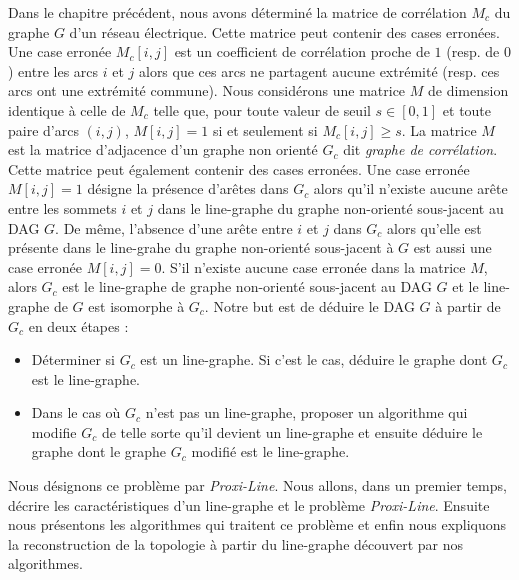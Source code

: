 Dans le chapitre pr\'ec\'edent, nous avons d\'etermin\'e la matrice de corr\'elation $M_c$ du graphe $G$ d'un r\'eseau \'electrique. Cette matrice peut contenir des cases erron\'ees. Une case erron\'ee  $M_c[i,j]$ est un coefficient de corr\'elation proche de $1$ (resp. de $0$) entre les arcs $i$ et $j$ alors que ces arcs ne partagent aucune extr\'emit\'e (resp. ces arcs ont une extr\'emit\'e commune).
\newline
Nous consid\'erons une matrice $M$ de dimension identique \`a celle de $M_c$ telle que, pour toute valeur de seuil $s \in [0,1]$ et toute paire d'arcs $(i,j)$, $M[i,j] = 1$ si et seulement si $M_c[i,j] \ge s$. La matrice $M$ est la matrice d'adjacence d'un graphe non orient\'e $G_c$ dit {\em graphe de corr\'elation}. Cette matrice peut \'egalement contenir des cases erron\'ees.  
Une case erron\'ee $M[i,j] = 1$ d\'esigne la pr\'esence d'ar\^etes dans $G_c$ alors qu'il n'existe aucune ar\^ete entre les sommets $i$ et $j$ dans le line-graphe du graphe non-orient\'e sous-jacent au DAG $G$. 
De m\^eme, l'absence d'une ar\^ete entre $i$ et $j$ dans $G_c$ alors qu'elle est pr\'esente dans le line-grahe du graphe non-orient\'e sous-jacent \`a $G$ est aussi une case erron\'ee  $M[i,j] = 0$.
\newline 
S'il n'existe aucune case erron\'ee dans la matrice $M$, alors $G_c$ est le line-graphe de graphe non-orient\'e sous-jacent au DAG $G$ et le line-graphe de $G$ est isomorphe \`a $G_c$.
Notre but est de d\'eduire le DAG $G$ \`a partir de $G_c$ en deux \'etapes :
\begin{itemize}
	\item D\'eterminer si $G_c$ est un line-graphe. Si c'est  le cas, d\'eduire le graphe dont $G_c$ est le line-graphe.
	\item Dans le cas o\`u $G_c$ n'est pas un line-graphe, proposer un algorithme qui modifie $G_c$ de telle sorte qu'il devient un line-graphe et ensuite d\'eduire le graphe dont le graphe $G_c$ modifi\'e est le line-graphe.
\end{itemize}
 Nous d\'esignons ce probl\`eme par {\em Proxi-Line}.
\newline
Nous allons, dans un premier temps, d\'ecrire les caract\'eristiques d'un line-graphe et le probl\`eme {\em Proxi-Line}. Ensuite nous pr\'esentons les algorithmes qui traitent ce probl\`eme et enfin nous expliquons la reconstruction de la topologie \`a partir du line-graphe d\'ecouvert par nos algorithmes. 
